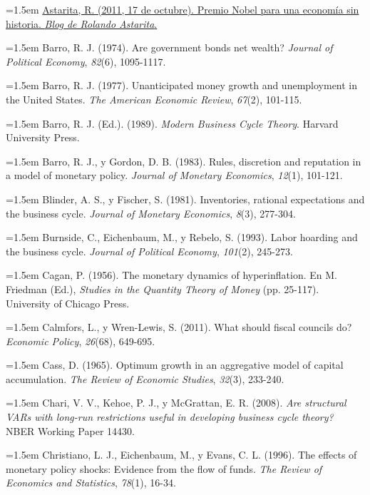 \documentclass[10pt,a4paper]{article}
\begin{document}
\noindent\hangindent=1.5em \href{https://rolandoastarita.blog/2011/10/17/premio-nobel-para-una-economia-sin-historia/}{Astarita, R. (2011, 17 de octubre). Premio Nobel para una economía sin historia. \textit{Blog de Rolando Astarita}.}

\noindent\hangindent=1.5em Barro, R. J. (1974). Are government bonds net wealth? \textit{Journal of Political Economy}, \textit{82}(6), 1095-1117.

\noindent\hangindent=1.5em Barro, R. J. (1977). Unanticipated money growth and unemployment in the United States. \textit{The American Economic Review}, \textit{67}(2), 101-115.

\noindent\hangindent=1.5em Barro, R. J. (Ed.). (1989). \textit{Modern Business Cycle Theory}. Harvard University Press.

\noindent\hangindent=1.5em Barro, R. J., y Gordon, D. B. (1983). Rules, discretion and reputation in a model of monetary policy. \textit{Journal of Monetary Economics}, \textit{12}(1), 101-121.

\noindent\hangindent=1.5em Blinder, A. S., y Fischer, S. (1981). Inventories, rational expectations and the business cycle. \textit{Journal of Monetary Economics}, \textit{8}(3), 277-304.

\noindent\hangindent=1.5em Burnside, C., Eichenbaum, M., y Rebelo, S. (1993). Labor hoarding and the business cycle. \textit{Journal of Political Economy}, \textit{101}(2), 245-273.

\noindent\hangindent=1.5em Cagan, P. (1956). The monetary dynamics of hyperinflation. En M. Friedman (Ed.), \textit{Studies in the Quantity Theory of Money} (pp. 25-117). University of Chicago Press.

\noindent\hangindent=1.5em Calmfors, L., y Wren-Lewis, S. (2011). What should fiscal councils do? \textit{Economic Policy}, \textit{26}(68), 649-695.

\noindent\hangindent=1.5em Cass, D. (1965). Optimum growth in an aggregative model of capital accumulation. \textit{The Review of Economic Studies}, \textit{32}(3), 233-240.

\noindent\hangindent=1.5em Chari, V. V., Kehoe, P. J., y McGrattan, E. R. (2008). \textit{Are structural VARs with long-run restrictions useful in developing business cycle theory?} NBER Working Paper 14430.

\noindent\hangindent=1.5em Christiano, L. J., Eichenbaum, M., y Evans, C. L. (1996). The effects of monetary policy shocks: Evidence from the flow of funds. \textit{The Review of Economics and Statistics}, \textit{78}(1), 16-34.
\end{document}
